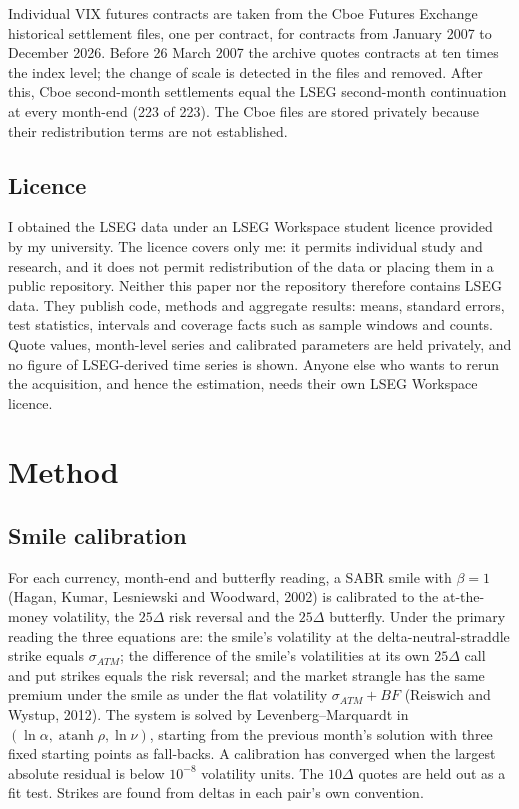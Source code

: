\documentclass[11pt]{article}
\theoremstyle{result}
\newcommand{\D}{\Delta}
\begin{document}
Individual VIX futures contracts are taken from the Cboe Futures Exchange historical settlement files, one per contract, for contracts from January 2007 to December 2026. Before 26 March 2007 the archive quotes contracts at ten times the index level; the change of scale is detected in the files and removed. After this, Cboe second-month settlements equal the LSEG second-month continuation at every month-end (223 of 223). The Cboe files are stored privately because their redistribution terms are not established.

\subsection{Licence}\label{sec:licence}

I obtained the LSEG data under an LSEG Workspace student licence provided by my university. The licence covers only me: it permits individual study and research, and it does not permit redistribution of the data or placing them in a public repository. Neither this paper nor the repository therefore contains LSEG data. They publish code, methods and aggregate results: means, standard errors, test statistics, intervals and coverage facts such as sample windows and counts. Quote values, month-level series and calibrated parameters are held privately, and no figure of LSEG-derived time series is shown. Anyone else who wants to rerun the acquisition, and hence the estimation, needs their own LSEG Workspace licence.

\section{Method}\label{sec:method}

\subsection{Smile calibration}

For each currency, month-end and butterfly reading, a SABR smile with $\beta=1$ (Hagan, Kumar, Lesniewski and Woodward, 2002) is calibrated to the at-the-money volatility, the $25\D$ risk reversal and the $25\D$ butterfly. Under the primary reading the three equations are: the smile's volatility at the delta-neutral-straddle strike equals $\sigma_{ATM}$; the difference of the smile's volatilities at its own $25\D$ call and put strikes equals the risk reversal; and the market strangle has the same premium under the smile as under the flat volatility $\sigma_{ATM}+BF$ (Reiswich and Wystup, 2012). The system is solved by Levenberg--Marquardt in $(\ln\alpha,\operatorname{atanh}\rho,\ln\nu)$, starting from the previous month's solution with three fixed starting points as fall-backs. A calibration has converged when the largest absolute residual is below $10^{-8}$ volatility units. The $10\D$ quotes are held out as a fit test. Strikes are found from deltas in each pair's own convention.
\end{document}
